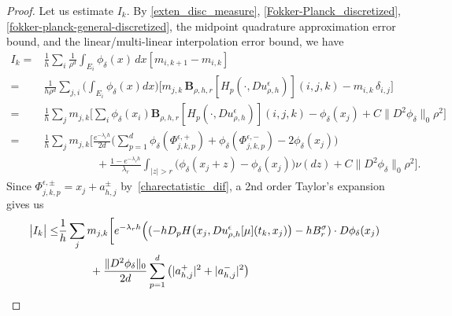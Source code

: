 \documentclass[a4paper,  twoside, 10pt, leqno]{amsart}
\theoremstyle{remark}
\theoremstyle{definition}
\begin{document}
\begin{proof}
Let us estimate $I_k$.
By \eqref{exten_disc_measure}, \eqref{Fokker-Planck_discretized}, \eqref{fokker-planck-general-discretized}, the  midpoint quadrature approximation error bound, and the linear/multi-linear interpolation error bound, we have
\begin{align*}
I_k 
=&\frac{1}{h} \sum_i  \frac{1}{\rho^d}  \int_{E_i} \phi_{\delta}(x)\, dx[m_{i,k+1} - m_{i,k}]\\
  =& \frac{1}{h\rho^d} \sum_{j,i}  \Big(\int_{E_i} \phi_{\delta}(x) dx \Big)\Big[ m_{j,k}   \, \mathbf{B}_{\rho,h,r} [ H_{p} ( \cdot, Du_{\rho,h}^{\epsilon} ) ] ( i,j,k ) 
 - m_{i,k}\, \delta_{i,j}\Big]  \\
=& \frac{1}{h} \sum_{j} m_{j,k} \Big[ \sum_i \phi_{\delta}(x_i)\mathbf{B}_{\rho,h,r} [ H_{p} ( \cdot, Du_{\rho,h}^{\epsilon} ) ] ( i,j,k ) - \phi_{\delta}(x_j) + C\|D^2 \phi_{\delta}\|_{0}\rho^2 \Big]      \\
=& \frac{1}{h} \sum _j m_{j,k}\Big[ \frac{e^{-\lambda_r h}}{2d} \Big( \sum^d_{p=1}\phi_{\delta}(\Phi^{\epsilon,+}_{j,k,p}) + \phi_{\delta} (\Phi^{\epsilon,-}_{j,k,p}) -2\phi_{\delta}(x_j)\Big) \\
 & \hspace{2cm}+ \frac{1-e^{-\lambda_r h}}{\lambda_r}\int_{| z | > r} \big(\phi_{\delta}(x_j + z)-\phi_{\delta}(x_j) \big)\nu(dz) + C\|D^2 \phi_{\delta}\|_{0}\rho^2 \Big] .
\end{align*}
Since $\Phi^{\epsilon,\pm}_{j,k,p}= x_j + a^{\pm}_{h,j}$ by~\eqref{charectatistic_dif}, a 2nd order Taylor's expansion gives us
\begin{align*}
\big|I_k   \big|
\leq  & \frac{1}{h}\sum_j m_{j,k}\bigg[e^{-\lambda_r h}\Big( (-h D_p H \big(x_j, Du^{\epsilon}_{\rho,h}[\mu](t_k,x_j)\big)  -hB_r^{\sigma})\cdot D\phi_{\delta}(x_j)  \\
 & \hspace*{1cm} +\frac{\|D^2\phi_{\delta}\|_{0}}{2d}\sum^d_{p=1}  \big(|a^{+}_{h,j}|^ 2+|a^{-}_{h,j}|^2\big)    

\end{align*}
\end{proof}
\end{document}
